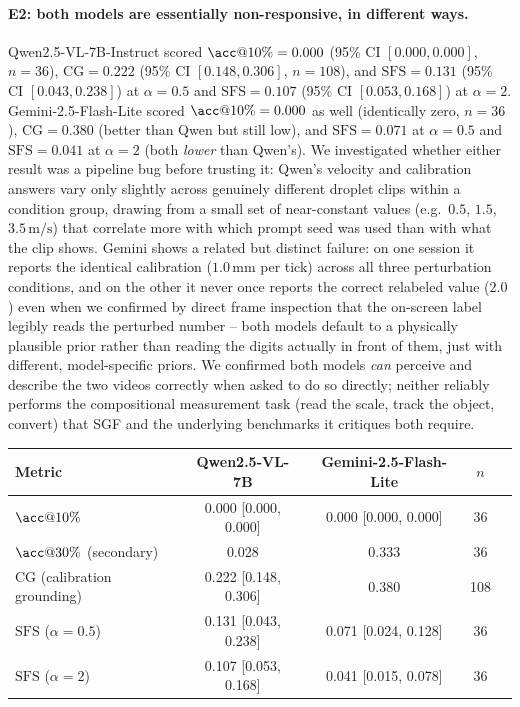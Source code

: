 \documentclass[11pt]{article}
\newcommand{\sfs}{\mathrm{SFS}}
\newcommand{\cg}{\mathrm{CG}}
\begin{document}
\paragraph{E2: both models are essentially non-responsive, in different ways.}
Qwen2.5-VL-7B-Instruct scored $\acc@10\% = 0.000$ (95\% CI $[0.000,0.000]$,
$n{=}36$), $\cg = 0.222$ (95\% CI $[0.148, 0.306]$, $n{=}108$), and
$\sfs = 0.131$ (95\% CI $[0.043, 0.238]$) at $\alpha{=}0.5$ and $\sfs = 0.107$
(95\% CI $[0.053, 0.168]$) at $\alpha{=}2$. Gemini-2.5-Flash-Lite scored
$\acc@10\% = 0.000$ as well (identically zero, $n{=}36$), $\cg = 0.380$ (better
than Qwen but still low), and $\sfs = 0.071$ at $\alpha{=}0.5$ and
$\sfs = 0.041$ at $\alpha{=}2$ (both \emph{lower} than Qwen's). We investigated
whether either result was a pipeline bug before trusting it: Qwen's velocity and
calibration answers vary only slightly across genuinely different droplet clips
within a condition group, drawing from a small set of near-constant values
(e.g.\ $0.5$, $1.5$, $3.5\,\mathrm{m/s}$) that correlate more with which prompt
seed was used than with what the clip shows. Gemini shows a related but distinct
failure: on one session it reports the identical calibration ($1.0\,\mathrm{mm}$
per tick) across all three perturbation conditions, and on the other it never
once reports the correct relabeled value ($2.0$) even when we confirmed by
direct frame inspection that the on-screen label legibly reads the perturbed
number -- both models default to a physically plausible prior rather than
reading the digits actually in front of them, just with different, model-specific
priors. We confirmed both models \emph{can} perceive and describe the two videos
correctly when asked to do so directly; neither reliably performs the
compositional measurement task (read the scale, track the object, convert) that
SGF and the underlying benchmarks it critiques both require.

\begin{center}
\small
\begin{tabular}{lcccc}
\toprule
\textbf{Metric} & \textbf{Qwen2.5-VL-7B} & \textbf{Gemini-2.5-Flash-Lite} & $n$ \\
\midrule
$\acc@10\%$ & 0.000 [0.000, 0.000] & 0.000 [0.000, 0.000] & 36 \\
$\acc@30\%$ (secondary) & 0.028 & 0.333 & 36 \\
$\cg$ (calibration grounding) & 0.222 [0.148, 0.306] & 0.380 & 108 \\
$\sfs$ ($\alpha{=}0.5$) & 0.131 [0.043, 0.238] & 0.071 [0.024, 0.128] & 36 \\
$\sfs$ ($\alpha{=}2$) & 0.107 [0.053, 0.168] & 0.041 [0.015, 0.078] & 36 \\
\bottomrule
\end{tabular}
\label{tab:e2}
\end{center}
\end{document}
